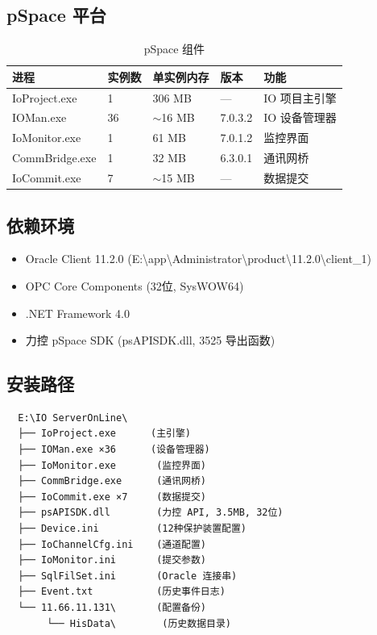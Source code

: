 \documentclass[12pt,a4paper]{ctexart}
\begin{document}
\subsection{pSpace 平台}

\begin{table}[H]\centering
\caption{pSpace 组件}
\begin{tabular}{p{3cm}p{1.5cm}p{2cm}p{1.5cm}p{4cm}}
\toprule
\textbf{进程} & \textbf{实例数} & \textbf{单实例内存} & \textbf{版本} & \textbf{功能} \\
\midrule
IoProject.exe & 1 & 306 MB & --- & IO 项目主引擎 \\
IOMan.exe & 36 & $\sim$16 MB & 7.0.3.2 & IO 设备管理器 \\
IoMonitor.exe & 1 & 61 MB & 7.0.1.2 & 监控界面 \\
CommBridge.exe & 1 & 32 MB & 6.3.0.1 & 通讯网桥 \\
IoCommit.exe & 7 & $\sim$15 MB & --- & 数据提交 \\
\bottomrule
\end{tabular}
\end{table}

\subsection{依赖环境}

\begin{itemize}[leftmargin=*]
  \item Oracle Client 11.2.0 (E:\textbackslash app\textbackslash Administrator\textbackslash product\textbackslash 11.2.0\textbackslash client\_1)
  \item OPC Core Components (32位, SysWOW64)
  \item .NET Framework 4.0
  \item 力控 pSpace SDK (psAPISDK.dll, 3525 导出函数)
\end{itemize}

\subsection{安装路径}

\begin{verbatim}
  E:\IO ServerOnLine\
  ├── IoProject.exe      (主引擎)
  ├── IOMan.exe ×36      (设备管理器)
  ├── IoMonitor.exe       (监控界面)
  ├── CommBridge.exe      (通讯网桥)
  ├── IoCommit.exe ×7     (数据提交)
  ├── psAPISDK.dll        (力控 API, 3.5MB, 32位)
  ├── Device.ini          (12种保护装置配置)
  ├── IoChannelCfg.ini    (通道配置)
  ├── IoMonitor.ini       (提交参数)
  ├── SqlFilSet.ini       (Oracle 连接串)
  ├── Event.txt           (历史事件日志)
  └── 11.66.11.131\       (配置备份)
       └── HisData\        (历史数据目录)
\end{verbatim}
\end{document}
